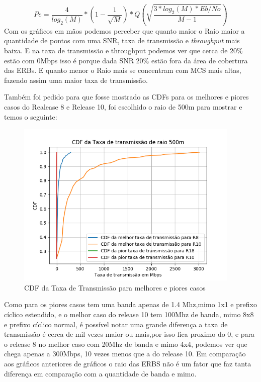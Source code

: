 \documentclass[12pt]{article}
\begin{document}
\begin{equation}
    Pe=\frac{4}{log_{2}(M)}*(1-\frac{1}{\sqrt{M}})*Q\left ( \sqrt{\frac{3*log_{2}(M)*Eb/No}{M-1}} \right )


\end{equation}
Com os gráficos em mãos podemos perceber que quanto maior o Raio maior a quantidade de pontos com uma SNR, taxa de transmissão e  \textit{throughput} mais baixa. E na taxa de transmissão e throughput podemos ver que cerca de 20\% estão com 0Mbps isso é porque dada SNR 20\% estão fora da área de cobertura das ERBs. E quanto menor o Raio mais se concentram com MCS mais altas, fazendo assim uma maior taxa de transmissão.

Também foi pedido para que fosse mostrado as CDFs para os melhores e piores casos do Realease 8 e Release 10, foi escolhido o raio de 500m para mostrar e temos o seguinte:
\begin{figure}[h!]
\includegraphics[width=0.95\textwidth]{CDF_especificos.png}
    \caption{CDF da Taxa de Transmissão para melhores e piores casos}
    \label{fig:my_label}
\end{figure}
\FloatBarrier
Como para os piores casos tem uma banda apenas de 1.4 Mhz,mimo 1x1 e prefixo cíclico estendido, e o melhor caso do release 10 tem 100Mhz de banda, mimo 8x8 e prefixo cíclico normal, é possível notar uma grande diferença a taxa de transmissão é cerca de mil vezes maior ou mais,por isso fica proximo do 0, e para o release 8 no melhor caso com 20Mhz de banda e mimo 4x4, podemos ver que chega apenas a 300Mbps, 10 vezes menos que a do release 10. Em comparação aos gráficos anteriores de gráficos o raio das ERBS não é um fator que faz tanta diferença em comparação com a quantidade de banda e mimo.
\end{document}
